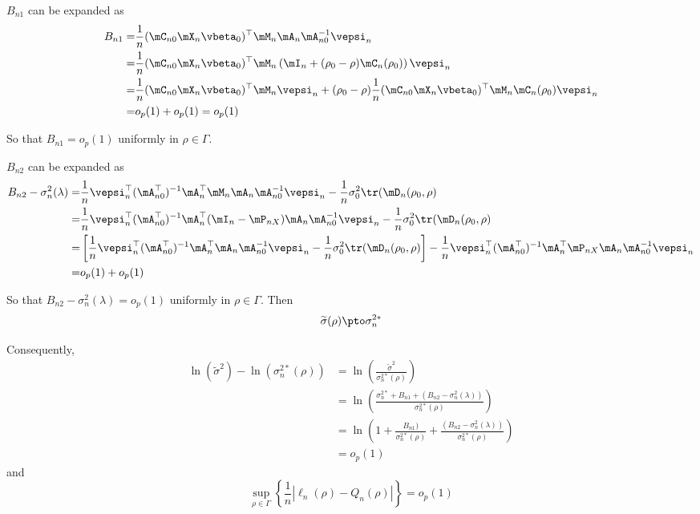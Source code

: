 \begin{subappendices}
$B_{n1}$ can be expanded as
\begin{equation*}
\begin{aligned}
B_{n1}  = &  \frac{1}{n}(\mC_{n0}\mX_n\vbeta_0)^\top\mM_n\mA_n\mA_{n0}^{-1}\vepsi_n \\
        = & \frac{1}{n}(\mC_{n0}\mX_n\vbeta_0)^\top\mM_n\left(\mI_n + (\rho_0 - \rho)\mC_n (\rho_0)\right)\vepsi_n \\
        = & \frac{1}{n}(\mC_{n0}\mX_n\vbeta_0)^\top\mM_n\vepsi_n + (\rho_0 - \rho)\frac{1}{n}(\mC_{n0}\mX_n\vbeta_0)^\top\mM_n\mC_n(\rho_0)\vepsi_n \\
        = & o_p(1) + o_p(1) = o_p(1)
\end{aligned} 
\end{equation*}

So that $B_{n1} = o_p(1)$ uniformly in $\rho \in \Gamma$.

$B_{n2}$ can be expanded as
\begin{equation*}
\begin{aligned}
B_{n2} - \sigma^2_n(\lambda) = & \frac{1}{n}\vepsi_n^\top(\mA_{n0}^\top)^{-1}\mA_n^\top\mM_n\mA_n\mA_{n0}^{-1}\vepsi_n -  \frac{1}{n}\sigma_0^2\tr(\mD_n(\rho_0, \rho)\\
= & \frac{1}{n}\vepsi_n^\top(\mA_{n0}^\top)^{-1}\mA_n^\top(\mI_n - \mP_{nX})\mA_n\mA_{n0}^{-1}\vepsi_n -  \frac{1}{n}\sigma_0^2\tr(\mD_n(\rho_0, \rho) \\
= & \left[\frac{1}{n}\vepsi_n^\top(\mA_{n0}^\top)^{-1}\mA_n^\top\mA_n\mA_{n0}^{-1}\vepsi_n -   \frac{1}{n}\sigma_0^2\tr(\mD_n(\rho_0, \rho)\right] - \frac{1}{n}\vepsi_n^\top(\mA_{n0}^\top)^{-1}\mA_n^\top\mP_{nX}\mA_n\mA_{n0}^{-1}\vepsi_n  \\
= & o_p(1) + o_p(1)
\end{aligned}
\end{equation*}

So that $B_{n2}  - \sigma^2_n(\lambda) = o_p(1)$ uniformly in $\rho \in \Gamma$. Then 
\begin{equation*}
\widetilde{\sigma}(\rho)  \pto \sigma^{2*}_n
\end{equation*}

Consequently, 
\begin{equation*}
\begin{aligned}
\ln( \widetilde{\sigma}^{2}) - \ln(\sigma^{2*}_n(\rho)) & = \ln\left(\frac{\widetilde{\sigma}^{2}}{\sigma^{2*}_n(\rho)}\right) \\
& = \ln\left(\frac{\sigma^{2*}_n + B_{n1} + (B_{n2} - \sigma^2_n(\lambda)) }{\sigma^{2*}_n(\rho)}\right) \\
& = \ln\left(1 + \frac{B_{n1}) }{\sigma^{2*}_n(\rho)} + \frac{(B_{n2} - \sigma^2_n(\lambda)) }{\sigma^{2*}_n(\rho)}\right) \\
& = o_p(1)
\end{aligned}
\end{equation*}
%
and
\begin{equation*}
\sup_{\rho\in \Gamma} \left\lbrace \frac{1}{n}\left|  \ell_n(\rho) - Q_n(\rho)\right|\right\rbrace = o_p(1)
\end{equation*}


\end{subappendices}
